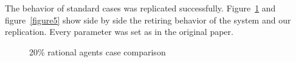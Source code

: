 \documentclass[runningheads,a4paper]{article}
\begin{document}
The behavior of standard cases was replicated successfully.
Figure~\ref{figure4} and figure~\ref{figure5} show side by side the retiring behavior of the system and our replication.
Every parameter was set as in the original paper.

\begin{figure}
\centering

\caption{20\% rational agents case comparison}
\label{figure4}
\end{figure}
\end{document}
